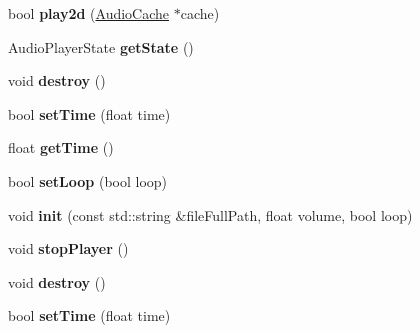 \begin{DoxyCompactItemize}
\item 
\mbox{\label{classexperimental_1_1AudioPlayer_a6404068ba91351e24ddf66a48ae07cd7}} 
bool {\bfseries play2d} (\hyperlink{classexperimental_1_1AudioCache}{Audio\+Cache} $\ast$cache)
\item 
\mbox{\label{classexperimental_1_1AudioPlayer_a75dd238b19d6e047406da4239e17f8b0}} 
Audio\+Player\+State {\bfseries get\+State} ()
\item 
\mbox{\label{classexperimental_1_1AudioPlayer_a8d200d91bb062474998c34efd8d7ed77}} 
void {\bfseries destroy} ()
\item 
\mbox{\label{classexperimental_1_1AudioPlayer_a3f1d251ee3b6c099eec507a11556b52c}} 
bool {\bfseries set\+Time} (float time)
\item 
\mbox{\label{classexperimental_1_1AudioPlayer_a6250cdadefad3f948d56ea2242409ea0}} 
float {\bfseries get\+Time} ()
\item 
\mbox{\label{classexperimental_1_1AudioPlayer_a189f3f0127e8f40df984dee1de7c41a4}} 
bool {\bfseries set\+Loop} (bool loop)
\item 
\mbox{\label{classexperimental_1_1AudioPlayer_a92f08f6cd842948515b5cdc6c2041b8b}} 
void {\bfseries init} (const std\+::string \&file\+Full\+Path, float volume, bool loop)
\item 
\mbox{\label{classexperimental_1_1AudioPlayer_ab37a6bc2f317946b6e38f477408d8350}} 
void {\bfseries stop\+Player} ()
\item 
\mbox{\label{classexperimental_1_1AudioPlayer_aecc5963dc973c603f80127e8d7ae7613}} 
void {\bfseries destroy} ()
\item 
\mbox{\label{classexperimental_1_1AudioPlayer_a3f1d251ee3b6c099eec507a11556b52c}} 
bool {\bfseries set\+Time} (float time)
\item 

\end{DoxyCompactItemize}
